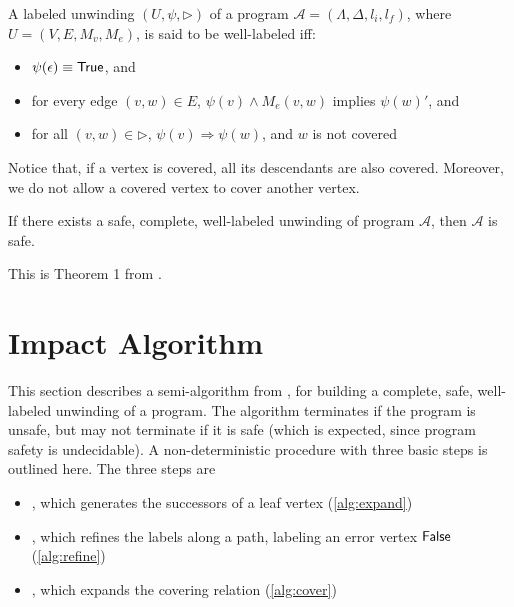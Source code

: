 \begin{defn}
  \label{defn:well-labeled-prog-unwinding}
  A labeled unwinding $(U, \psi, \rhd)$ of a program $\mathcal{A} = (\Lambda, \Delta, l_i, l_f)$, where $U = (V, E, M_v, M_e)$, is said to be well-labeled iff:

  \begin{itemize}
    \item $\psi(\epsilon) \equiv \mathsf{True}$, and
    \item for every edge $(v,w) \in E$, $\psi(v) \wedge M_e(v,w)$ implies $\psi(w)'$, and
    \item for all $(v,w) \in \rhd$, $\psi(v) \Rightarrow \psi(w)$, and $w$ is not covered
  \end{itemize}
\end{defn}

Notice that, if a vertex is covered, all its descendants are also covered. Moreover, we do not allow a covered vertex to cover another vertex.

\begin{thm}
  If there exists a safe, complete, well-labeled unwinding of program $\mathcal{A}$, then $\mathcal{A}$ is safe.
\end{thm}

This is Theorem 1 from \cite{mcmillan06}.

\section{Impact Algorithm}
\label{sec:impact-algorithm}
%

This section describes a semi-algorithm from \cite{mcmillan06}, for building a complete, safe, well-labeled unwinding of a program. The algorithm terminates if the program is unsafe, but may not terminate if it is safe (which is expected, since program safety is undecidable). A non-deterministic procedure with three basic steps is outlined here. The three steps are

\begin{itemize}
  \item \expand, which generates the successors of a leaf vertex (\autoref{alg:expand})
  \item {}, which refines the labels along a path, labeling an error vertex $\mathsf{False}$ (\autoref{alg:refine})
  \item \cover, which expands the covering relation (\autoref{alg:cover})
\end{itemize}

